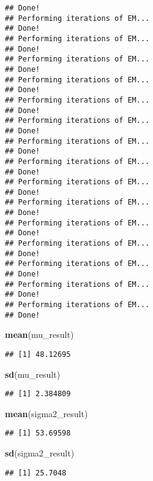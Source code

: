 \documentclass[]{article}
\newenvironment{Shaded}{\begin{snugshade}}{\end{snugshade}}
\newcommand{\KeywordTok}[1]{\textcolor[rgb]{0.13,0.29,0.53}{\textbf{#1}}}
\newcommand{\NormalTok}[1]{#1}
\begin{document}
\begin{verbatim}
## Done! 
## Performing iterations of EM... 
## Done! 
## Performing iterations of EM... 
## Done! 
## Performing iterations of EM... 
## Done! 
## Performing iterations of EM... 
## Done! 
## Performing iterations of EM... 
## Done! 
## Performing iterations of EM... 
## Done! 
## Performing iterations of EM... 
## Done! 
## Performing iterations of EM... 
## Done! 
## Performing iterations of EM... 
## Done! 
## Performing iterations of EM... 
## Done! 
## Performing iterations of EM... 
## Done! 
## Performing iterations of EM... 
## Done! 
## Performing iterations of EM... 
## Done! 
## Performing iterations of EM... 
## Done! 
## Performing iterations of EM... 
## Done!
\end{verbatim}

\begin{Shaded}
\begin{Highlighting}[]
\KeywordTok{mean}\NormalTok{(mu_result)}
\end{Highlighting}
\end{Shaded}

\begin{verbatim}
## [1] 48.12695
\end{verbatim}

\begin{Shaded}
\begin{Highlighting}[]
\KeywordTok{sd}\NormalTok{(mu_result)}
\end{Highlighting}
\end{Shaded}

\begin{verbatim}
## [1] 2.384809
\end{verbatim}

\begin{Shaded}
\begin{Highlighting}[]
\KeywordTok{mean}\NormalTok{(sigma2_result)}
\end{Highlighting}
\end{Shaded}

\begin{verbatim}
## [1] 53.69598
\end{verbatim}

\begin{Shaded}
\begin{Highlighting}[]
\KeywordTok{sd}\NormalTok{(sigma2_result)}
\end{Highlighting}
\end{Shaded}

\begin{verbatim}
## [1] 25.7048
\end{verbatim}
\end{document}
